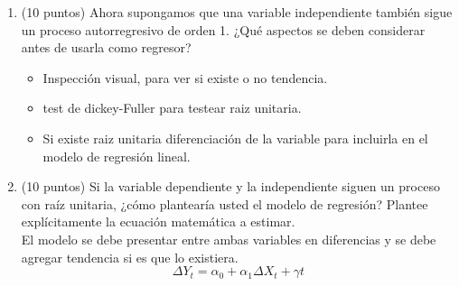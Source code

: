 \documentclass[10pt,a4paper]{article}
\begin{document}
\begin{enumerate}
\begin{enumerate}
    \item (10 puntos) Ahora supongamos que una variable independiente también sigue
    un proceso autorregresivo de orden 1. ¿Qué aspectos se deben considerar antes de usarla como regresor?
        \\
        \begin{itemize}
        \item Inspección visual, para ver si existe o no tendencia.
        \item test de dickey-Fuller para testear raiz unitaria.
        \item Si existe raiz unitaria diferenciación de la variable para incluirla en el modelo de regresión lineal.
    \end{itemize}
    \item (10 puntos) Si la variable dependiente y la independiente siguen un
    proceso con raíz unitaria, ¿cómo plantearía usted el modelo de
    regresión? Plantee explícitamente la ecuación matemática a estimar.
\\
El modelo se debe presentar entre ambas variables en diferencias y se debe agregar tendencia si es que lo existiera.
$$\Delta Y_t = \alpha_0 + \alpha_1 \Delta X_t + \gamma t$$
\end{enumerate}

\end{enumerate}
\end{document}
